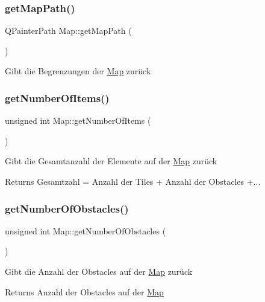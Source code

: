 \subsubsection{\texorpdfstring{get\+Map\+Path()}{getMapPath()}}
{\footnotesize\ttfamily Q\+Painter\+Path Map\+::get\+Map\+Path (\begin{DoxyParamCaption}{ }\end{DoxyParamCaption})}

Gibt die Begrenzungen der \mbox{\hyperlink{class_map}{Map}} zurück \mbox{\label{class_map_af960a5f3d085679f49fc56b0cc0ffdaf}} 
\subsubsection{\texorpdfstring{get\+Number\+Of\+Items()}{getNumberOfItems()}}
{\footnotesize\ttfamily unsigned int Map\+::get\+Number\+Of\+Items (\begin{DoxyParamCaption}{ }\end{DoxyParamCaption})}

Gibt die Gesamtanzahl der Elemente auf der \mbox{\hyperlink{class_map}{Map}} zurück \begin{DoxyReturn}{Returns}
Gesamtzahl = Anzahl der Tiles + Anzahl der Obstacles +... 
\end{DoxyReturn}
\mbox{\label{class_map_a2314b59099da9d9fdd16e9f816150709}} 
\subsubsection{\texorpdfstring{get\+Number\+Of\+Obstacles()}{getNumberOfObstacles()}}
{\footnotesize\ttfamily unsigned int Map\+::get\+Number\+Of\+Obstacles (\begin{DoxyParamCaption}{ }\end{DoxyParamCaption})}

Gibt die Anzahl der Obstacles auf der \mbox{\hyperlink{class_map}{Map}} zurück \begin{DoxyReturn}{Returns}
Anzahl der Obstacles auf der \mbox{\hyperlink{class_map}{Map}} 
\end{DoxyReturn}
\mbox{\label{class_map_ae993424a64bb5638db33127d2a450014}} 
